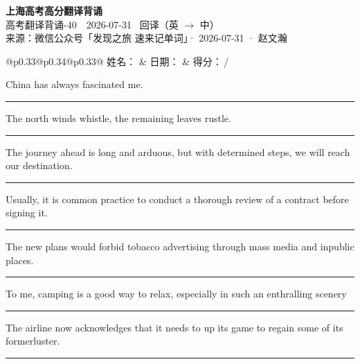 \documentclass[11pt,a4paper]{article}
\newcommand{\num}[1]{\makebox[1.9em][r]{#1.}\hspace{0.3em}}
\newcommand{\wline}{\noindent\rule{\linewidth}{0.4pt}}
\begin{document}
\pagestyle{plain}
\begin{center}
{\LARGE\bfseries 上海高考高分翻译背诵 }\\[0.25em]
{\large 高考翻译背诵-40　2026-07-31 \quad\ 回译（英 $\to$ 中）}\\[0.35em]
{\footnotesize 来源：微信公众号「发现之旅 速来记单词」· 2026-07-31 · 赵文瀚}
\end{center}

\vspace{0.4em}
\noindent\begin{tabular}{@{}p{0.33\textwidth}@{}p{0.34\textwidth}@{}p{0.33\textwidth}@{}}
姓名：\underline{\hspace{2.0cm}} & 日期：\underline{\hspace{2.0cm}} & 得分：\underline{\hspace{1.4cm}}\,/ \\
\end{tabular}

\vspace{0.5em}

\vspace{0.8em}
\num{1}China has always fascinated me.

\vspace{0.25em}

\wline

\num{2}The north winds whistle, the remaining leaves rustle.

\vspace{0.25em}

\wline

\num{3}The journey ahead is long and arduous, but with determined steps, we will reach our destination.

\vspace{0.25em}

\wline

\num{4}Usually, it is common practice to conduct a thorough review of a contract before signing it.

\vspace{0.25em}

\wline

\num{5}The new plans would forbid tobacco advertising through mass media and inpublic places.

\vspace{0.25em}

\wline

\num{6}To me, camping is a good way to relax, especially in such an enthralling scenery

\vspace{0.25em}

\wline

\num{7}The airline now acknowledges that it needs to up its game to regain some of its formerluster.

\vspace{0.25em}

\wline
\end{document}
